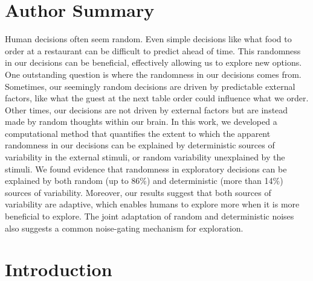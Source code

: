 \documentclass[12pt]{article}
\begin{document}
	\section*{Author Summary}
	Human decisions often seem random. Even simple decisions like what food to order at a restaurant can be difficult to predict ahead of time. This randomness in our decisions can be beneficial, effectively allowing us to explore new options. One outstanding question is where the randomness in our decisions comes from. Sometimes, our seemingly random decisions are driven by predictable external factors, like what the guest at the next table order could influence what we order. Other times, our decisions are not driven by external factors but are instead made by random thoughts within our brain. In this work, we developed a computational method that quantifies the extent to which the apparent randomness in our decisions can be explained by deterministic sources of variability in the external stimuli, or random variability unexplained by the stimuli. We found evidence that randomness in exploratory decisions can be explained by both random (up to 86\%) and deterministic (more than 14\%) sources of variability. Moreover, our results suggest that both sources of variability are adaptive, which enables humans to explore more when it is more beneficial to explore. The joint adaptation of random and deterministic noises also suggests a common noise-gating mechanism for exploration.  
	
	\newpage
	\section*{Introduction}
	
\end{document}
